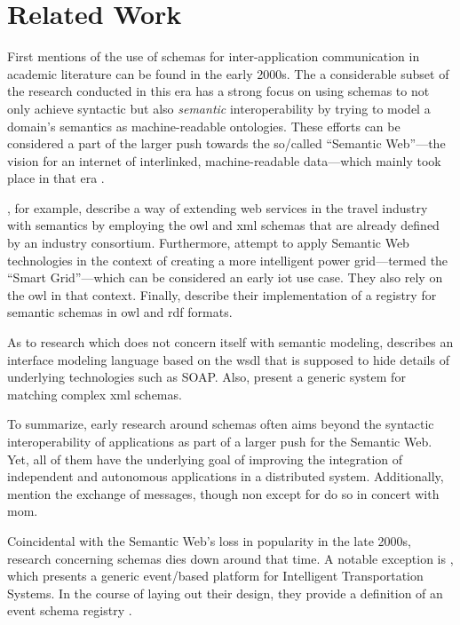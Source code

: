 
\section{Related Work}\label{sec:related-work}

First mentions of the use of schemas for inter-application communication in academic literature can be found in the early 2000s.
The a considerable subset of the research conducted in this era has a strong focus on using schemas to not only achieve syntactic but also \emph{semantic} interoperability by trying to model a domain's semantics as machine-readable ontologies.
These efforts can be considered a part of the larger push towards the so\-/called \enquote{Semantic Web}---the vision for an internet of interlinked, machine-readable data---which mainly took place in that era \parencite{noauthor_semantic_nodate}.

\cite{dogac_semantically_2004}, for example, describe a way of extending web services in the travel industry with semantics by employing the \gls{owl} and \gls{xml} schemas that are already defined by an industry consortium.
Furthermore, \cite{crapo_semantically_2009} attempt to apply Semantic Web technologies in the context of creating a more intelligent power grid---termed the \enquote{Smart Grid}---which can be considered an early \gls{iot} use case. They also rely on the \gls{owl} in that context.
Finally, \cite{heery_metadata_2003} describe their implementation of a registry for semantic schemas in \gls{owl} and \gls{rdf} formats.

As to research which does not concern itself with semantic modeling, \cite{duftler_web_2001} describes an interface modeling language based on the \gls{wsdl} that is supposed to hide details of underlying technologies such as SOAP.
Also, \cite{do_matching_2007} present a generic system for matching complex \gls{xml} schemas.

To summarize, early research around schemas often aims beyond the syntactic interoperability of applications as part of a larger push for the Semantic Web.
Yet, all of them have the underlying goal of improving the integration of independent and autonomous applications in a distributed system.
Additionally, \cites{duftler_web_2001}{dogac_semantically_2004}{li_semantic_2004}{crapo_semantically_2009} mention the exchange of messages, though non except for \cite{li_semantic_2004} do so in concert with \gls{mom}.

Coincidental with the Semantic Web's loss in popularity in the late 2000s, research concerning schemas dies down around that time.
A notable exception is \cite{ma_iip_2010}, which presents a generic event\-/based platform for Intelligent Transportation Systems.
In the course of laying out their design, they provide a definition of an event schema registry \parencite[see][p.~3]{ma_iip_2010}.

